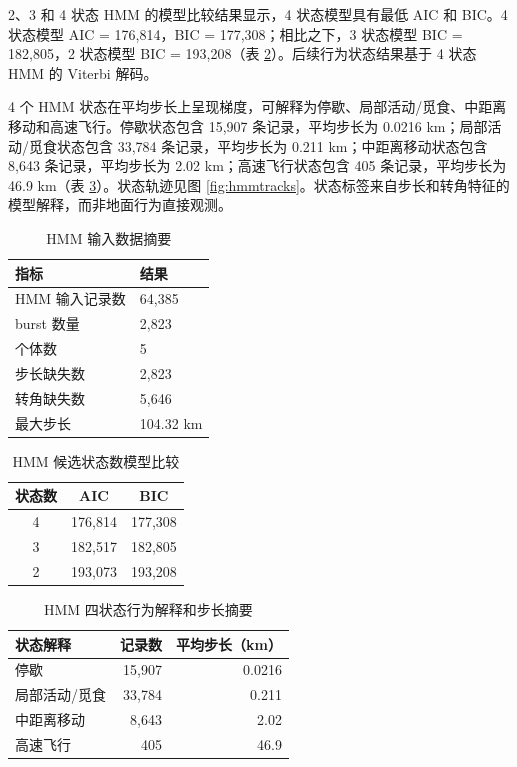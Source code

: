\documentclass[UTF8,a4paper,12pt]{ctexart}
\begin{document}
2、3 和 4 状态 HMM 的模型比较结果显示，4 状态模型具有最低 AIC 和 BIC。4 状态模型 AIC = 176,814，BIC = 177,308；相比之下，3 状态模型 BIC = 182,805，2 状态模型 BIC = 193,208（表 \ref{tab:hmmcompare}）。后续行为状态结果基于 4 状态 HMM 的 Viterbi 解码。

4 个 HMM 状态在平均步长上呈现梯度，可解释为停歇、局部活动/觅食、中距离移动和高速飞行。停歇状态包含 15,907 条记录，平均步长为 0.0216 km；局部活动/觅食状态包含 33,784 条记录，平均步长为 0.211 km；中距离移动状态包含 8,643 条记录，平均步长为 2.02 km；高速飞行状态包含 405 条记录，平均步长为 46.9 km（表 \ref{tab:states}）。状态轨迹见图 \ref{fig:hmmtracks}。状态标签来自步长和转角特征的模型解释，而非地面行为直接观测。

\begin{table}[H]
  \centering
  \caption{HMM 输入数据摘要}
  \label{tab:hmminput}
  \begin{tabular}{ll}
    \toprule
    指标 & 结果 \\
    \midrule
    HMM 输入记录数 & 64,385 \\
    burst 数量 & 2,823 \\
    个体数 & 5 \\
    步长缺失数 & 2,823 \\
    转角缺失数 & 5,646 \\
    最大步长 & 104.32 km \\
    \bottomrule
  \end{tabular}
\end{table}

\begin{table}[H]
  \centering
  \caption{HMM 候选状态数模型比较}
  \label{tab:hmmcompare}
  \begin{tabular}{ccc}
    \toprule
    状态数 & AIC & BIC \\
    \midrule
    4 & 176,814 & 177,308 \\
    3 & 182,517 & 182,805 \\
    2 & 193,073 & 193,208 \\
    \bottomrule
  \end{tabular}
\end{table}

\begin{table}[H]
  \centering
  \caption{HMM 四状态行为解释和步长摘要}
  \label{tab:states}
  \begin{tabular}{lrr}
    \toprule
    状态解释 & 记录数 & 平均步长（km） \\
    \midrule
    停歇 & 15,907 & 0.0216 \\
    局部活动/觅食 & 33,784 & 0.211 \\
    中距离移动 & 8,643 & 2.02 \\
    高速飞行 & 405 & 46.9 \\
    \bottomrule
  \end{tabular}
\end{table}
\end{document}
